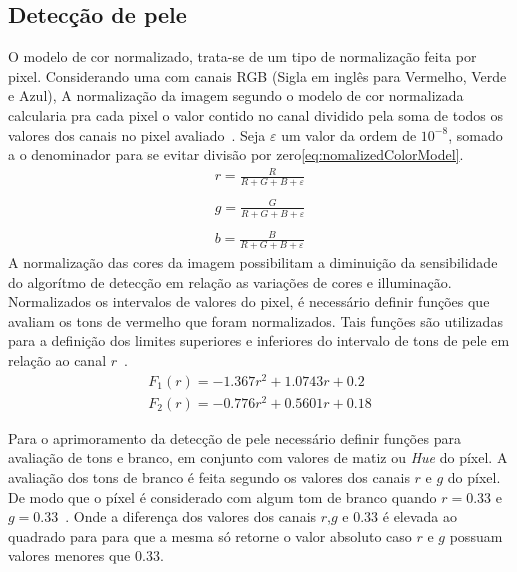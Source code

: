 \documentclass[journal,onecolumn]{IEEEtran}
\begin{document}
	\subsection{Detecção de pele}
	O modelo de cor normalizado, trata-se de um tipo de normalização feita por pixel. 
	Considerando uma com canais RGB (Sigla em inglês para Vermelho, Verde e Azul), 
	A normalização da imagem segundo o modelo de cor normalizada calcularia pra cada pixel o valor contido no canal dividido pela soma de todos os valores dos canais no pixel avaliado~\cite{chen2007simple,loesdau2017chromatic}. 
	Seja $\varepsilon$ um valor da ordem de $10^{-8}$, somado a o denominador para se evitar divisão por zero\eqref{eq:nomalizedColorModel}.	
	\begin{equation}
		\begin{split}
			r  = \frac{R}{R+G+B+\varepsilon} \\\\
			g  = \frac{G}{R+G+B+\varepsilon} \\\\
			b  = \frac{B}{R+G+B+\varepsilon}
			\label{eq:nomalizedColorModel}
		\end{split}
	\end{equation}		
	A normalização das cores da imagem possibilitam a diminuição da sensibilidade do algorítmo de detecção em relação as variações de cores e illuminação.
	Normalizados os intervalos de valores do pixel, é necessário definir funções que avaliam os tons de vermelho  que foram normalizados.
	Tais funções são utilizadas para a definição dos limites superiores e inferiores do intervalo de tons de pele em relação ao canal $r$~\cite{soriano2000using,chen2007simple}.
	\begin{equation}
		\begin{split}
			F_1(r)  = -1.367r^2 + 1.0743r + 0.2 \\
			F_2(r)  = -0.776r^2 + 0.5601r + 0.18
		\end{split}
	\end{equation}
	
	Para o aprimoramento da detecção de pele necessário definir funções para avaliação de tons e branco, em conjunto com valores de matiz ou \textit{Hue} do píxel.
	A avaliação dos tons de branco é feita segundo os valores dos canais $r$ e $g$ do píxel. 
	De modo que o píxel é considerado com algum tom de branco quando $r=0.33$ e $g=0.33$~\cite{chen2007simple}.
	Onde a diferença dos valores dos canais $r$,$g$ e $0.33$ é elevada ao quadrado para para que a mesma só retorne o valor absoluto caso $r$ e $g$ possuam valores menores que $0.33$.
	
\end{document}
